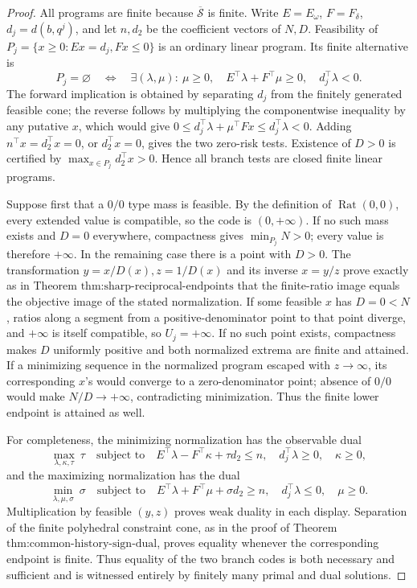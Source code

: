 \documentclass{article}
\begin{document}
\begin{proof}
All programs are finite because \(\overline{\mathcal S}\) is finite.  Write \(E=E_\omega\), \(F=F_\delta\), \(d_j=d(b,q^j)\), and let \(n,d_2\) be the coefficient vectors of \(N,D\).  Feasibility of \(P_j=\{x\geq0:Ex=d_j,Fx\leq0\}\) is an ordinary linear program.  Its finite alternative is
\[
P_j=\varnothing
\quad\Longleftrightarrow\quad
\exists(\lambda,\mu):\ \mu\geq0,\quad E^\top\lambda+F^\top\mu\geq0,
\quad d_j^\top\lambda<0.
\]
The forward implication is obtained by separating \(d_j\) from the finitely generated feasible cone; the reverse follows by multiplying the componentwise inequality by any putative \(x\), which would give \(0\leq d_j^\top\lambda+\mu^\top Fx\leq d_j^\top\lambda<0\).  Adding \(n^\top x=d_2^\top x=0\), or \(d_2^\top x=0\), gives the two zero-risk tests.  Existence of \(D>0\) is certified by \(\max_{x\in P_j}d_2^\top x>0\).  Hence all branch tests are closed finite linear programs.

Suppose first that a \(0/0\) type mass is feasible.  By the definition of \(\operatorname{Rat}(0,0)\), every extended value is compatible, so the code is \((0,+\infty)\).  If no such mass exists and \(D=0\) everywhere, compactness gives \(\min_{P_j}N>0\); every value is therefore \(+\infty\).  In the remaining case there is a point with \(D>0\).  The transformation \(y=x/D(x),z=1/D(x)\) and its inverse \(x=y/z\) prove exactly as in Theorem \(\text{thm:sharp-reciprocal-endpoints}\) that the finite-ratio image equals the objective image of the stated normalization.  If some feasible \(x\) has \(D=0<N\), ratios along a segment from a positive-denominator point to that point diverge, and \(+\infty\) is itself compatible, so \(U_j=+\infty\).  If no such point exists, compactness makes \(D\) uniformly positive and both normalized extrema are finite and attained.  If a minimizing sequence in the normalized program escaped with \(z\to\infty\), its corresponding \(x\)'s would converge to a zero-denominator point; absence of \(0/0\) would make \(N/D\to+\infty\), contradicting minimization.  Thus the finite lower endpoint is attained as well.

For completeness, the minimizing normalization has the observable dual
\[
\max_{\lambda,\kappa,\tau}\ \tau
\quad\text{subject to}\quad
E^\top\lambda-F^\top\kappa+\tau d_2\leq n,
\quad d_j^\top\lambda\geq0,\quad\kappa\geq0,
\]
and the maximizing normalization has the dual
\[
\min_{\lambda,\mu,\sigma}\ \sigma
\quad\text{subject to}\quad
E^\top\lambda+F^\top\mu+\sigma d_2\geq n,
\quad d_j^\top\lambda\leq0,\quad\mu\geq0.
\]
Multiplication by feasible \((y,z)\) proves weak duality in each display.  Separation of the finite polyhedral constraint cone, as in the proof of Theorem \(\text{thm:common-history-sign-dual}\), proves equality whenever the corresponding endpoint is finite.  Thus equality of the two branch codes is both necessary and sufficient and is witnessed entirely by finitely many primal and dual solutions.


\end{proof}
\end{document}
